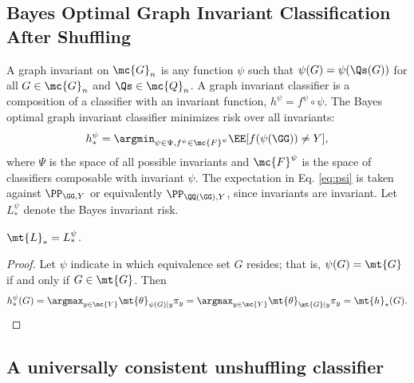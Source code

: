 \subsection{Bayes Optimal Graph Invariant Classification After Shuffling} %
\label{sec:gi}

A graph invariant on $\mc{G}_n$ is any function $\psi$  such that $\psi(G)=\psi(\Qs(G))$ for all $G \in \mc{G}_n$ and $\Qs \in \mc{Q}_n$.  A graph invariant classifier is a composition of a classifier with an invariant function, $h^\psi=f^\psi \circ \psi$.  The Bayes optimal graph invariant classifier minimizes risk over all invariants: 
\begin{align} \label{eq:psi}
	h_*^{\psi}=\argmin_{\psi \in \Psi, f^{\psi} \in \mc{F}^{\psi}} \EE[f(\psi(\GG))\neq Y],
\end{align}
where $\Psi$ is the space of all possible invariants and $\mc{F}^{\psi}$ is the space of classifiers composable with invariant $\psi$. The expectation in Eq. \eqref{eq:psi} is taken against $\PP_{\GG,Y}$ or equivalently $\PP_{\QQ(\GG),Y}$, since invariants are invariant.
  Let $L_*^{\psi}$ denote the Bayes invariant risk.  
\begin{thm} \label{thm:3}
	$\mt{L}_*=L_*^\psi$.
\end{thm}

\begin{proof}
Let $\psi$ indicate in which equivalence set $G$ resides; that is,  $\psi(G)=\mt{G}$ if and only if $G \in \mt{G}$.  Then
\begin{align}
	h^{\psi}_*(G)= \argmax_{y \in \mc{Y}} \mt{\theta}_{\psi(G)|y} \pi_y = \argmax_{y \in \mc{Y}} \mt{\theta}_{\mt{G}|y} \pi_y = \mt{h}_*(G).
\end{align}
\end{proof}



\subsection{A universally consistent unshuffling classifier} %
\label{sec:bayes_optimal_graph_invariant_based_classifier}


